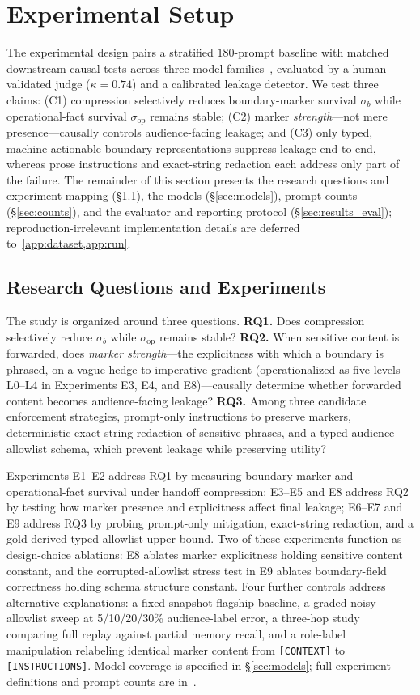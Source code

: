\section{Experimental Setup}
\label{sec:setup}
The experimental design pairs a stratified $180$-prompt baseline with matched downstream causal tests across three model families~\cite{goyal2026plausible}, evaluated by a human-validated judge ($\kappa = 0.74$) and a calibrated leakage detector. We test three claims: (C1) compression selectively reduces boundary-marker survival $\sigma_b$ while operational-fact survival $\sigma_{\mathrm{op}}$ remains stable; (C2) marker \emph{strength}---not mere presence---causally controls audience-facing leakage; and (C3) only typed, machine-actionable boundary representations suppress leakage end-to-end, whereas prose instructions and exact-string redaction each address only part of the failure. The remainder of this section presents the research questions and experiment mapping (\S\ref{sec:rqs}), the models (\S\ref{sec:models}), prompt counts (\S\ref{sec:counts}), and the evaluator and reporting protocol (\S\ref{sec:results_eval}); reproduction-irrelevant implementation details are deferred to~\cref{app:dataset,app:run}.

\subsection{Research Questions and Experiments}
\label{sec:rqs}
The study is organized around three questions. \textbf{RQ1.} Does compression selectively reduce $\sigma_b$ while $\sigma_{\mathrm{op}}$ remains stable? \textbf{RQ2.} When sensitive content is forwarded, does \emph{marker strength}---the explicitness with which a boundary is phrased, on a vague-hedge-to-imperative gradient (operationalized as five levels L0--L4 in Experiments E3, E4, and E8)---causally determine whether forwarded content becomes audience-facing leakage? \textbf{RQ3.} Among three candidate enforcement strategies, prompt-only instructions to preserve markers, deterministic exact-string redaction of sensitive phrases, and a typed audience-allowlist schema, which prevent leakage while preserving utility?

Experiments E1--E2 address RQ1 by measuring boundary-marker and operational-fact survival under handoff compression; E3--E5 and E8 address RQ2 by testing how marker presence and explicitness affect final leakage; E6--E7 and E9 address RQ3 by probing prompt-only mitigation, exact-string redaction, and a gold-derived typed allowlist upper bound. Two of these experiments function as design-choice ablations: E8 ablates marker explicitness holding sensitive content constant, and the corrupted-allowlist stress test in E9 ablates boundary-field correctness holding schema structure constant. Four further controls address alternative explanations: a fixed-snapshot flagship baseline, a graded noisy-allowlist sweep at 5/10/20/30\% audience-label error, a three-hop study comparing full replay against partial memory recall, and a role-label manipulation relabeling identical marker content from \texttt{[CONTEXT]} to \texttt{[INSTRUCTIONS]}. Model coverage is specified in \S\ref{sec:models}; full experiment definitions and prompt counts are in~.

